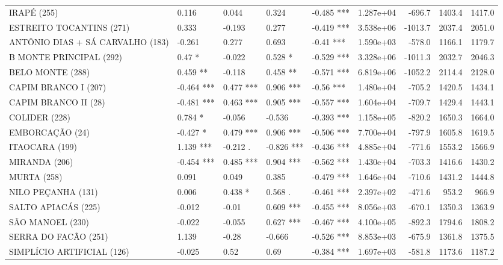 \documentclass[12pt,oneside]{book}\usepackage[]{graphicx}\usepackage[]{color}
\newenvironment{knitrout}{}{} %
\theoremstyle{definition} %
\begin{document}
\begin{knitrout}
\begin{table}
{\begin{tabular}[t]{lllllrrrr}
\rowcolor{gray!6}  IRAPÉ (255) & 0.116 & 0.044 & 0.324 & -0.485 *** & 1.287e+04 & -696.7 & 1403.4 & 1417.0\\
\addlinespace
ESTREITO TOCANTINS (271) & 0.333 & -0.193 & 0.277 & -0.419 *** & 3.538e+06 & -1013.7 & 2037.4 & 2051.0\\
\rowcolor{gray!6}  ANTÔNIO DIAS + SÁ CARVALHO (183) & -0.261 & 0.277 & 0.693 & -0.41 *** & 1.590e+03 & -578.0 & 1166.1 & 1179.7\\
B MONTE PRINCIPAL (292) & 0.47 * & -0.022 & 0.528 * & -0.529 *** & 3.328e+06 & -1011.3 & 2032.7 & 2046.3\\
\rowcolor{gray!6}  BELO MONTE (288) & 0.459 ** & -0.118 & 0.458 ** & -0.571 *** & 6.819e+06 & -1052.2 & 2114.4 & 2128.0\\
CAPIM BRANCO I (207) & -0.464 *** & 0.477 *** & 0.906 *** & -0.56 *** & 1.480e+04 & -705.2 & 1420.5 & 1434.1\\
\addlinespace
\rowcolor{gray!6}  CAPIM BRANCO II (28) & -0.481 *** & 0.463 *** & 0.905 *** & -0.557 *** & 1.604e+04 & -709.7 & 1429.4 & 1443.1\\
COLIDER (228) & 0.784 * & -0.056 & -0.536 & -0.393 *** & 1.158e+05 & -820.2 & 1650.3 & 1664.0\\
\rowcolor{gray!6}  EMBORCAÇÃO (24) & -0.427 * & 0.479 *** & 0.906 *** & -0.506 *** & 7.700e+04 & -797.9 & 1605.8 & 1619.5\\
ITAOCARA (199) & 1.139 *** & -0.212 . & -0.826 *** & -0.436 *** & 4.885e+04 & -771.6 & 1553.2 & 1566.9\\
\rowcolor{gray!6}  MIRANDA (206) & -0.454 *** & 0.485 *** & 0.904 *** & -0.562 *** & 1.430e+04 & -703.3 & 1416.6 & 1430.2\\
\addlinespace
MURTA (258) & 0.091 & 0.049 & 0.385 & -0.479 *** & 1.646e+04 & -710.6 & 1431.2 & 1444.8\\
\rowcolor{gray!6}  NILO PEÇANHA (131) & 0.006 & 0.438 * & 0.568 . & -0.461 *** & 2.397e+02 & -471.6 & 953.2 & 966.9\\
SALTO APIACÁS (225) & -0.012 & -0.01 & 0.609 *** & -0.455 *** & 8.056e+03 & -670.1 & 1350.3 & 1363.9\\
\rowcolor{gray!6}  SÃO MANOEL (230) & -0.022 & -0.055 & 0.627 *** & -0.467 *** & 4.100e+05 & -892.3 & 1794.6 & 1808.2\\
SERRA DO FACÃO (251) & 1.139 & -0.28 & -0.666 & -0.526 *** & 8.853e+03 & -675.9 & 1361.8 & 1375.5\\
\addlinespace
\rowcolor{gray!6}  SIMPLÍCIO ARTIFICIAL (126) & -0.025 & 0.52 & 0.69 & -0.384 *** & 1.697e+03 & -581.8 & 1173.6 & 1187.2\\

\end{tabular}}
\end{table}
\end{knitrout}
\end{document}
